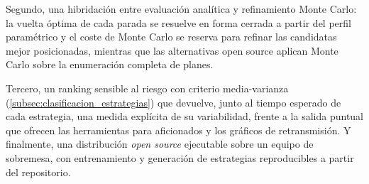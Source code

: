 Segundo, una hibridación entre evaluación analítica y refinamiento Monte Carlo: la vuelta óptima de cada parada se resuelve en forma cerrada a partir del perfil paramétrico y el coste de Monte Carlo se reserva para refinar las candidatas mejor posicionadas, mientras que las alternativas open source aplican Monte Carlo sobre la enumeración completa de planes. 

Tercero, un ranking sensible al riesgo con criterio media-varianza (\ref{subsec:clasificacion_estrategias}) que devuelve, junto al tiempo esperado de cada estrategia, una medida explícita de su variabilidad, frente a la salida puntual que ofrecen las herramientas para aficionados y los gráficos de retransmisión. Y finalmente, una distribución \textit{open source} ejecutable sobre un equipo de sobremesa, con entrenamiento y generación de estrategias reproducibles a partir del repositorio.
